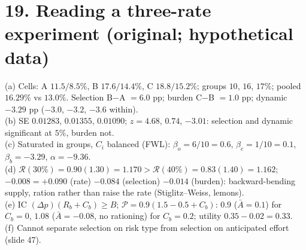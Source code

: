 \documentclass[11pt,a4paper]{article}
\begin{document}
\section*{19. Reading a three-rate experiment (original; hypothetical data)}
(a) Cells: A $11.5/8.5\%$, B $17.6/14.4\%$, C $18.8/15.2\%$; groups $10$, $16$, $17\%$; pooled $16.29\%$ vs $13.0\%$.
Selection B$-$A $=6.0$ pp; burden C$-$B $=1.0$ pp; dynamic $-3.29$ pp ($-3.0$, $-3.2$, $-3.6$ within).\\
(b) SE $0.01283$, $0.01355$, $0.01090$; $z=4.68$, $0.74$, $-3.01$: selection and dynamic significant at $5\%$, burden not.\\
(c) Saturated in groups, $C_i$ balanced (FWL): $\beta_o=6/10=0.6$, $\beta_c=1/10=0.1$, $\beta_b=-3.29$, $\alpha=-9.36$.\\
(d) $\mathcal R(30\%)=0.90(1.30)=1.170>\mathcal R(40\%)=0.83(1.40)=1.162$; $-0.008=+0.090$ (rate) $-0.084$ (selection)
$-0.014$ (burden): backward-bending supply, ration rather than raise the rate (Stiglitz--Weiss, lemons).\\
(e) IC $(\Delta p)(R_b+C_b)\ge B$; $\mathcal P=0.9(1.5-0.5+C_b)$: $0.9$ ($\bar A=0.1$) for $C_b=0$, $1.08$ ($\bar A=-0.08$, no
rationing) for $C_b=0.2$; utility $0.35-0.02=0.33$.\\
(f) Cannot separate selection on risk type from selection on anticipated effort (slide 47).
\end{document}
